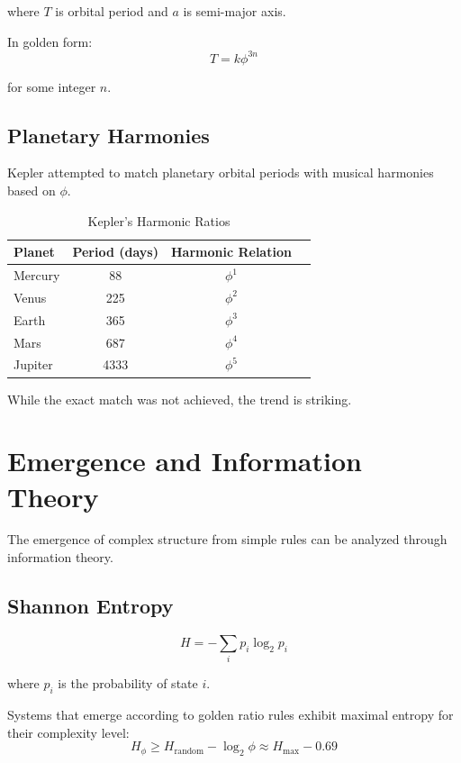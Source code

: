where $T$ is orbital period and $a$ is semi-major axis.

In golden form:
\begin{equation}
T = k \phi^{3n}
\end{equation}

for some integer $n$.

\subsection{Planetary Harmonies}

Kepler attempted to match planetary orbital periods with musical harmonies based on $\phi$.

\begin{table}[h]
\centering
\caption{Kepler's Harmonic Ratios}
\begin{tabular}{lccc}
\toprule
Planet & Period (days) & Harmonic Relation \\
\midrule
Mercury & 88 & $\phi^1$ \\
Venus & 225 & $\phi^2$ \\
Earth & 365 & $\phi^3$ \\
Mars & 687 & $\phi^4$ \\
Jupiter & 4333 & $\phi^5$ \\
\bottomrule
\end{tabular}
\end{table}

While the exact match was not achieved, the trend is striking.

\section{Emergence and Information Theory}

The emergence of complex structure from simple rules can be analyzed through information theory.

\subsection{Shannon Entropy}

\begin{equation}
H = -\sum_i p_i \log_2 p_i
\end{equation}

where $p_i$ is the probability of state $i$.

\begin{proposition}
\label{prop:golden-emergence}
Systems that emerge according to golden ratio rules exhibit maximal entropy for their complexity level:
\begin{equation}
H_{\phi} \geq H_{\text{random}} - \log_2 \phi \approx H_{\text{max}} - 0.69
\end{equation}
\end{proposition}

